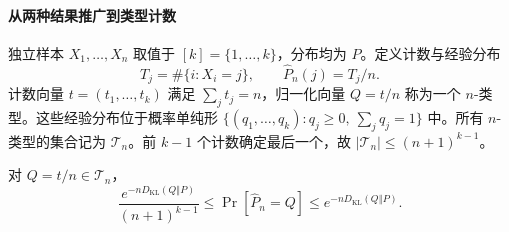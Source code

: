 \documentclass[lang=cn,a4paper,fontset=none,zihao=false,10pt,openany,twoside]{beautybook}
\numberwithin{algorithm}{chapter}
\newcommand{\KLsep}{\mathrel{\Vert}}
\begin{document}
\paragraph{从两种结果推广到类型计数}
\begin{definition}[类型与经验分布]\label{def:empirical-type}
独立样本 $X_1,\ldots,X_n$ 取值于 $[k]=\{1,\ldots,k\}$，分布均为 $P$。定义计数与经验分布
\[
 T_j=\#\{i:X_i=j\},\qquad \widehat P_n(j)=T_j/n.
\]
计数向量 $t=(t_1,\ldots,t_k)$ 满足 $\sum_jt_j=n$，归一化向量 $Q=t/n$ 称为一个 $n$-类型。这些经验分布位于概率单纯形 $\{(q_1,\ldots,q_k):q_j\ge0,\ \sum_jq_j=1\}$ 中。所有 $n$-类型的集合记为 $\mathcal T_n$。前 $k-1$ 个计数确定最后一个，故 $|\mathcal T_n|\le(n+1)^{k-1}$。
\end{definition}
\begin{proposition}[一个类型的概率]\label{prop:type-probability}
对 $Q=t/n\in\mathcal T_n$，
\[
 \frac{e^{-nD_{\mathrm{KL}}(Q\KLsep P)}}{(n+1)^{k-1}}
 \le\Pr[\widehat P_n=Q]\le e^{-nD_{\mathrm{KL}}(Q\KLsep P)}.
\]
\end{proposition}
\end{document}
